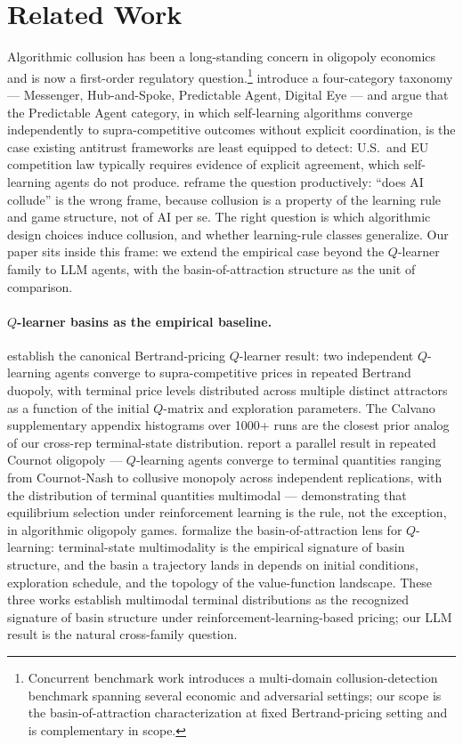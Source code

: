 \section{Related Work}
\label{sec:related}

Algorithmic collusion has been a long-standing concern in oligopoly economics and is now a first-order regulatory question.\footnote{Concurrent benchmark work \citep{Tailor_2025_whisper} introduces a multi-domain collusion-detection benchmark spanning several economic and adversarial settings; our scope is the basin-of-attraction characterization at fixed Bertrand-pricing setting and is complementary in scope.} \citet{ezrachi2016virtual} introduce a four-category taxonomy --- Messenger, Hub-and-Spoke, Predictable Agent, Digital Eye --- and argue that the Predictable Agent category, in which self-learning algorithms converge independently to supra-competitive outcomes without explicit coordination, is the case existing antitrust frameworks are least equipped to detect: U.S.\ and EU competition law typically requires evidence of explicit agreement, which self-learning agents do not produce. \citet{asker2021ai_pricing} reframe the question productively: ``does AI collude'' is the wrong frame, because collusion is a property of the learning rule and game structure, not of AI per se. The right question is which algorithmic design choices induce collusion, and whether learning-rule classes generalize. Our paper sits inside this frame: we extend the empirical case beyond the $Q$-learner family to LLM agents, with the basin-of-attraction structure as the unit of comparison.

\paragraph{$Q$-learner basins as the empirical baseline.}
\citet{calvano_etal_2020_ai_algorithmic_pricing_collusion} establish the canonical Bertrand-pricing $Q$-learner result: two independent $Q$-learning agents converge to supra-competitive prices in repeated Bertrand duopoly, with terminal price levels distributed across multiple distinct attractors as a function of the initial $Q$-matrix and exploration parameters. The Calvano supplementary appendix histograms over 1000+ runs are the closest prior analog of our cross-rep terminal-state distribution. \citet{waltman_kaymak_2008_qlearning_cournot} report a parallel result in repeated Cournot oligopoly --- $Q$-learning agents converge to terminal quantities ranging from Cournot-Nash to collusive monopoly across independent replications, with the distribution of terminal quantities multimodal --- demonstrating that equilibrium selection under reinforcement learning is the rule, not the exception, in algorithmic oligopoly games. \citet{wunder_littman_babes_2010_qlearning_basin} formalize the basin-of-attraction lens for $Q$-learning: terminal-state multimodality is the empirical signature of basin structure, and the basin a trajectory lands in depends on initial conditions, exploration schedule, and the topology of the value-function landscape. These three works establish multimodal terminal distributions as the recognized signature of basin structure under reinforcement-learning-based pricing; our LLM result is the natural cross-family question.

